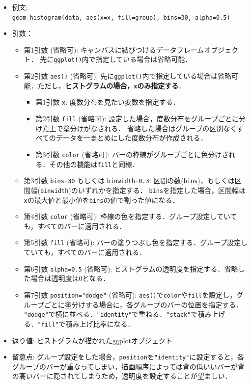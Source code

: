 \documentclass[
  xelatex, ja=standard]{bxjsarticle}
\providecommand{\tightlist}{%
  \setlength{\itemsep}{0pt}\setlength{\parskip}{0pt}}
\begin{document}
\begin{itemize}
\tightlist
\item
  例文:
  \texttt{geom\_histogram(data,\ aes(x=x,\ fill=group),\ bins=30,\ alpha=0.5)}
\item
  引数：

  \begin{itemize}
  \tightlist
  \item
    第1引数 (省略可): キャンバスに結びつけるデータフレームオブジェクト．
    先に\texttt{ggplot()}内で指定している場合は省略可能．
  \item
    第2引数 \texttt{aes()} (省略可):
    先に\texttt{ggplot()}内で指定している場合は省略可能．ただし，\textbf{ヒストグラムの場合，\texttt{x}のみ指定する}．

    \begin{itemize}
    \tightlist
    \item
      第1引数 \texttt{x}: 度数分布を見たい変数を指定する．
    \item
      第2引数 \texttt{fill} (省略可):
      設定した場合，度数分布をグループごとに分けた上で塗分けがなされる．
      省略した場合はグループの区別なくすべてのデータを一まとめにした度数分布が作成される．
    \item
      第3引数 \texttt{color} (省略可):
      バーの枠線がグループごとに色分けされる．その他の機能は\texttt{fill}と同様．
    \end{itemize}
  \item
    第3引数 \texttt{bins=30} もしくは \texttt{binwidth=0.3}:
    区間の数(\texttt{bins})，もしくは区間幅(\texttt{binwidth})のいずれかを指定する．
    \texttt{bins}を指定した場合，区間幅は\texttt{x}の最大値と最小値を\texttt{bins}の値で割った値になる．
  \item
    第4引数 \texttt{color} (省略可):
    枠線の色を指定する．グループ設定していても，すべてのバーに適用される．
  \item
    第5引数 \texttt{fill} (省略可):
    バーの塗りつぶし色を指定する．グループ設定していても，すべてのバーに適用される．
  \item
    第6引数 \texttt{alpha=0.5} (省略可):
    ヒストグラムの透明度を指定する．省略した場合は透明度は0となる．
  \item
    第7引数 \texttt{position="dodge"} (省略可):
    \texttt{aes()}で\texttt{color}や\texttt{fill}を設定し，グループごとに塗分けする場合に，各グループのバーの位置を指定する．
    \texttt{"dodge"}で横に並べる．\texttt{"identity"}で重ねる．\texttt{"stack"}で積み上げる．\texttt{"fill"}で積み上げ比率になる．
  \end{itemize}
\item
  返り値: ヒストグラムが描かれたggplotオブジェクト
\item
  留意点:
  グループ設定をした場合，\texttt{position}を\texttt{"identity"}に設定すると，各グループのバーが重なってしまい，描画順序によっては背の低いいバーが背の高いバーに隠されてしまうため，透明度を設定することが望ましい．
\end{itemize}
\end{document}
